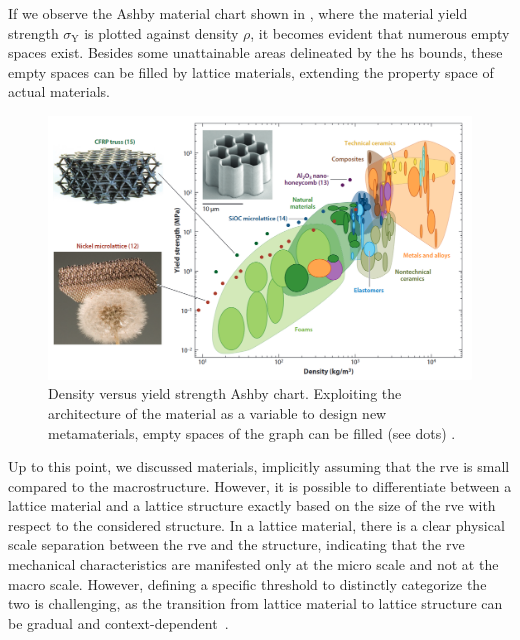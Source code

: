 If we observe the Ashby material chart shown in , where the material yield strength $\sigma_\text{Y}$ is plotted against density $\rho$, it becomes evident that numerous empty spaces exist. Besides some unattainable areas delineated by the \gls{hs} bounds, these empty spaces can be filled by lattice materials, extending the property space of actual materials.
\begin{figure}
    \centering
    \includegraphics[width=\linewidth]{figures/02_literature/ashby_chart.png}
    \caption{Density versus yield strength Ashby chart. Exploiting the architecture of the material as a variable to design new metamaterials, empty spaces of the graph can be filled (see dots) \cite{schaedler_architected_2016}.}
    \label{fig:02_ashby_ch}
\end{figure}

Up to this point, we discussed materials, implicitly assuming that the \gls{rve} is small compared to the macrostructure. However, it is possible to differentiate between a lattice material and a lattice structure exactly based on the size of the \gls{rve} with respect to the considered structure. In a lattice material, there is a clear physical scale separation between the \gls{rve} and the structure, indicating that the \gls{rve} mechanical characteristics are manifested only at the micro scale and not at the macro scale. However, defining a specific threshold to distinctly categorize the two is challenging, as the transition from lattice material to lattice structure can be gradual and context-dependent~.

